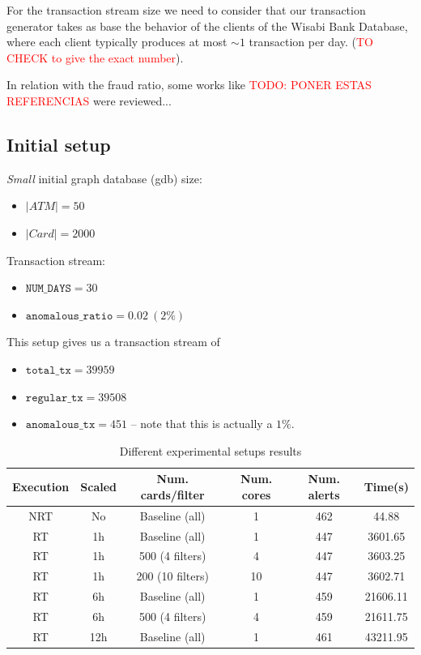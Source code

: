 \documentclass{article}
\begin{document}
For the transaction stream size we need to consider that our transaction generator takes as base the behavior of the clients of the 
Wisabi Bank Database, where each client typically produces at most $\sim 1$ transaction per day. (\textcolor{red}{TO CHECK to give the exact number}).

In relation with the fraud ratio, some works like \textcolor{red}{TODO: PONER ESTAS REFERENCIAS} were reviewed...

\subsection{Initial setup}

\textit{Small} initial graph database (gdb) size:
\begin{itemize}
  \item $|ATM| = 50$
  \item $|Card| = 2000$
\end{itemize}

Transaction stream:
\begin{itemize}
  \item $\texttt{NUM\_DAYS} = 30$
  \item $\texttt{anomalous\_ratio} = 0.02\ (2\%)$ 
\end{itemize}

This setup gives us a transaction stream of 
\begin{itemize}
  \item $\texttt{total\_tx} = 39959$
  \item $\texttt{regular\_tx} = 39508$
  \item $\texttt{anomalous\_tx} = 451$ -- note that this is actually a $1\%$.
\end{itemize}

\begin{table}[H]
\centering
\begin{tabular}{|c|c|c|c|c|c|}
  \hline
  Execution & Scaled   & Num. cards/filter& Num. cores & Num. alerts & Time(s) \\ \hline
  NRT & No & Baseline (all) & 1 & 462 & 44.88 \\ \hline
  RT  & 1h & Baseline (all) & 1 & 447 & 3601.65\\ \hline
  RT  & 1h & 500 (4 filters) & 4 & 447 & 3603.25\\ \hline
  RT  & 1h & 200 (10 filters) & 10 & 447 & 3602.71\\ \hline
  RT  & 6h & Baseline (all) & 1 & 459 & 21606.11 \\ \hline
  RT  & 6h & 500 (4 filters) & 4 & 459 & 21611.75 \\ \hline
  RT  & 12h & Baseline (all) & 1 & 461 & 43211.95 \\ \hline
\end{tabular}
\caption{Different experimental setups results}
\label{table:small-results}
\end{table}
\end{document}
